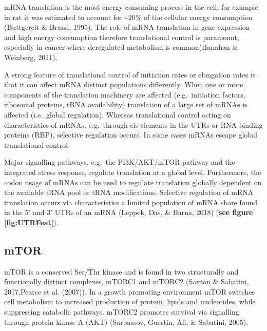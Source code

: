 \documentclass[12pt,openany]{book}
\begin{document}
mRNA translation is the most energy consuming process in the cell, for
example in rat it was estimated to account for \textasciitilde{}20\% of
the cellular energy consumption (Buttgereit \& Brand, 1995). The role of
mRNA translation in gene expression and high energy consumption
therefore translational control is paramount, especially in cancer where
deregulated metabolism is common(Hanahan \& Weinberg, 2011).

A strong feature of translational control of initiation rates or
elongation rates is that it can affect mRNA distinct populations
differently. When one or more components of the translation machinery
are affected (e.g.~initiation factors, ribosomal proteins, tRNA
availability) translation of a large set of mRNAs is affected
(i.e.~global regulation). Whereas translational control acting on
characteristics of mRNAs, e.g.~through cis elements in the UTRs or RNA
binding proteins (RBP), selective regulation occurs. In some cases mRNAs
escape global translational control.

Major signalling pathways, e.g.~the PI3K/AKT/mTOR pathway and the
integrated stress response, regulate translation at a global level.
Furthermore, the codon usage of mRNAs can be used to regulate
translation globally dependent on the available tRNA pool or tRNA
modifications. Selective regulation of mRNA translation occurs via
characteristics a limited population of mRNA share found in the 5' and
3' UTRs of an mRNA (Leppek, Das, \& Barna, 2018) (\textbf{see figure
\ref{fig:UTRFeat}}).

\subsection{mTOR} \label{mTOR}

mTOR is a conserved Ser/Thr kinase and is found in two structurally and
functionally distinct complexes, mTORC1 and mTORC2 (Saxton \& Sabatini,
2017,Pearce et al. (2007)). In a growth promoting environment mTOR
switches cell metabolism to increased production of protein, lipids and
nucleotides, while suppressing catabolic pathways. mTORC2 promotes
survival via signalling through protein kinase A (AKT) (Sarbassov,
Guertin, Ali, \& Sabatini, 2005).
\end{document}
